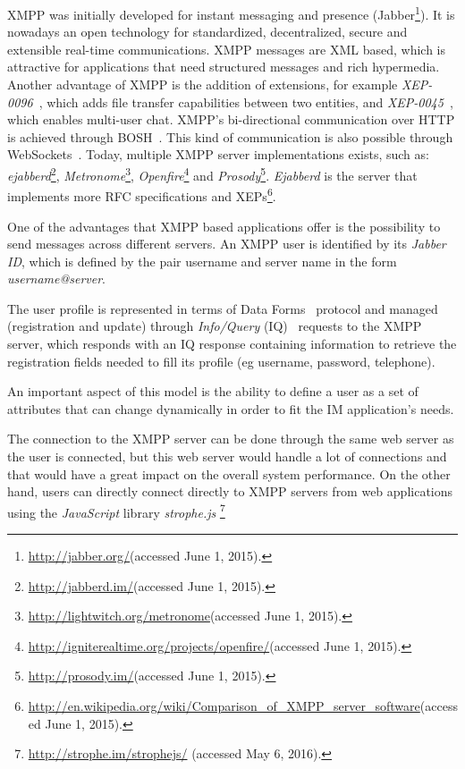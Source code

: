   \ac{XMPP} was initially developed for instant messaging and presence (Jabber\footnote{\url{http://jabber.org/}(accessed June 1, 2015).}). It is nowadays an open technology for standardized, decentralized, secure and extensible real-time communications. 
  \ac{XMPP} messages are \ac{XML} based, which is attractive for applications that need structured messages and rich hypermedia. Another advantage of \ac{XMPP} is the addition of extensions, for example \emph{XEP-0096}~\cite{xep0096}, which adds file transfer capabilities between two entities, and \emph{XEP-0045}~\cite{xep0045}, which enables multi-user chat.
  \ac{XMPP}'s bi-directional communication over \ac{HTTP} is achieved through \ac{BOSH}~\cite{xep0206}.
  This kind of communication is also possible through WebSockets~\cite{rfc7395}.
  Today, multiple \ac{XMPP} server implementations exists, such as: \emph{ejabberd}\footnote{\url{http://jabberd.im/}(accessed June 1, 2015).}, \emph{Metronome}\footnote{\url{http://lightwitch.org/metronome}(accessed June 1, 2015).}, \emph{Openfire}\footnote{\url{http://igniterealtime.org/projects/openfire/}(accessed June 1, 2015).} and \emph{Prosody}\footnote{\url{http://prosody.im/}(accessed June 1, 2015).}. \emph{Ejabberd} is the server that implements more \ac{RFC} specifications and \ac{XEP}s\footnote{\url{http://en.wikipedia.org/wiki/Comparison_of_XMPP_server_software}(accessed June 1, 2015).}.
  

    One of the advantages that \ac{XMPP} based applications offer is the possibility to send messages across different servers. An \ac{XMPP} user is identified by its \textit{Jabber ID}, which is defined by the pair username and server name in the form \textit{username@server}.

    The user profile is represented in terms of Data Forms~\cite{xep0004} protocol and managed (registration and update) through \textit{Info/Query} (IQ)~\cite{rfc3920} requests to the \ac{XMPP} server, which responds with an IQ response containing information to retrieve the registration fields needed to fill its profile (eg username, password, telephone). 
    
    An important aspect of this model is the ability to define a user as a set of attributes that can change dynamically in order to fit the \ac{IM} application's needs. 

    The connection to the \ac{XMPP} server can be done through the same web server as the user is connected, but this web server would handle a lot of connections and that would have a great impact on the overall system performance. On the other hand, users can directly connect directly to \ac{XMPP} servers from web applications using the \emph{JavaScript} library \emph{strophe.js} \footnote{\url{http://strophe.im/strophejs/} (accessed May 6, 2016).}

